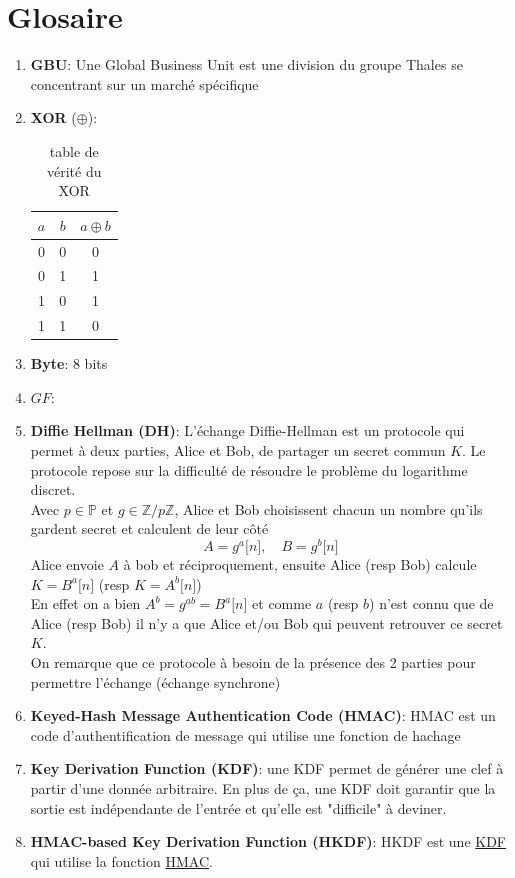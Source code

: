 \documentclass[a4paper, 12pt]{article}
\begin{document}
\section*{Glosaire}
\begin{enumerate}
\item \textbf{GBU}\label{GBU}: Une Global Business Unit est une division du groupe Thales se concentrant sur un marché spécifique
\item \textbf{XOR}\label{XOR} ($\oplus$):\\
	\begin{table}[h]
	\center
	\begin{tabular}{|c|c|c|}
	\hline
		$a$ & $b$ & $a\oplus b$ \\ \hline\hline
		0 & 0 & 0 \\ \hline
		0 & 1 & 1 \\ \hline
		1 & 0 & 1 \\ \hline
		1 & 1 & 0 \\ \hline
	\end{tabular}
	\caption{table de vérité du XOR}
	\label{XOR_table}
	\end{table}
\item \textbf{Byte}\label{byte}: 8 bits	
\item $GF$\label{GF}: 
\item \textbf{Diffie Hellman (DH)}\label{DH}: L'échange Diffie-Hellman est un protocole qui permet à deux parties, Alice et Bob, de partager un secret commun $K$. Le protocole repose sur la difficulté de résoudre le problème du logarithme discret. \\

\noindent Avec $p \in \mathbb{P}$ et $g\in \mathbb{Z}/p\mathbb{Z}$, Alice et Bob choisissent chacun un nombre qu'ils gardent secret et calculent de leur côté 
$$
A = g^a \lbrack n \rbrack, \quad B = g^b \lbrack n \rbrack 
$$
Alice envoie $A$ à bob et réciproquement, ensuite Alice (resp Bob) calcule $K = B^a \lbrack n \rbrack$ (resp $K = A^b \lbrack n \rbrack$) \\

\noindent En effet on a bien $A^b = g^{ab} = B^a \lbrack n \rbrack$ et comme $a$ (resp $b$) n'est connu que de Alice (resp Bob) il n'y a que Alice et/ou Bob qui peuvent retrouver ce secret $K$.\\

\noindent On remarque que ce protocole à besoin de la présence des 2 parties pour permettre l'échange (échange synchrone)	
\item \textbf{Keyed-Hash Message Authentication Code (HMAC)}\label{HMAC}: HMAC est un code d'authentification de message qui utilise une fonction de hachage
\item \textbf{Key Derivation Function (KDF)}\label{KDF}: une KDF permet de générer une clef à partir d'une donnée arbitraire. En plus de ça, une KDF doit garantir que la sortie est indépendante de l'entrée et qu'elle est "difficile" à deviner. 
\item \textbf{HMAC-based Key Derivation Function (HKDF)}\label{HKDF}: HKDF est une \hyperref[KDF]{KDF} qui utilise la fonction \hyperref[HMAC]{HMAC}.


\end{enumerate}
\end{document}
